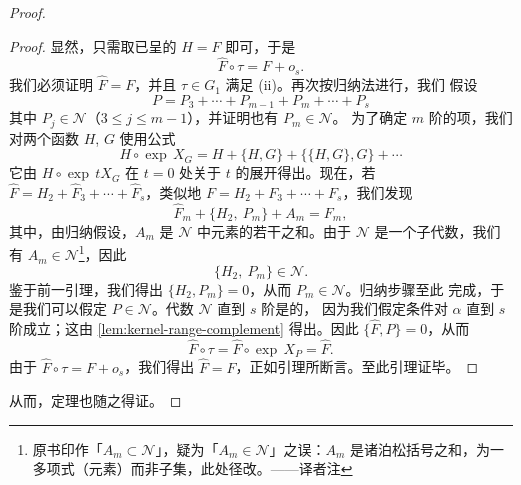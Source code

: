 \begin{proof}
\begin{proof}
\let\qed\relax%
显然，只需取已呈\trNormalForm{}的 $H=F$ 即可，于是
\[
\hat{F}\circ\tau=F+o_s.
\]
我们必须证明 $\hat{F}=F$，并且 $\tau\in G_1$ 满足 (ii)。再次按归纳法进行，我们%
假设
\[
P=P_3+\dotsb+P_{m-1}+P_m+\dotsb+P_s
\]
其中 $P_j\in\mathcal{N}$（$3\leq j\leq m-1$），并证明也有 $P_m\in\mathcal{N}$。%
为了确定 $m$ 阶的项，我们对两个函数 $H$, $G$ 使用公式
\[
H\circ\exp\,X_G=H+\{H,G\}+\bigl\{\{H,G\},G\bigr\}+\dotsb
\]
它由 $H\circ\exp\,tX_G$ 在 $t=0$ 处关于 $t$ 的\trTaylor{}展开得出。现在，若%
$\hat{F}=H_2+\hat{F}_3+\dotsb+\hat{F}_s$，类似地 $F=H_2+F_3+\dotsb+F_s$，我们发现
\[
\hat{F}_m+\bigl\{H_2,\ P_m\bigr\}+A_m=F_m,
\]
其中，由归纳假设，$A_m$ 是 $\mathcal{N}$ 中元素的若干\trPoissonBracket{}之和。由于%
$\mathcal{N}$ 是一个子代数，我们有 $A_m\in\mathcal{N}$\footnote{原书印作「$A_m\subset\mathcal{N}$」，疑为「$A_m\in\mathcal{N}$」之误：$A_m$ 是诸泊松括号之和，为一多项式（元素）而非子集，此处径改。——译者注}，因此
\[
\bigl\{H_2,\ P_m\bigr\}\in\mathcal{N}.
\]
鉴于前一引理，我们得出 $\{H_2,P_m\}=0$，从而 $P_m\in\mathcal{N}$。归纳步骤至此%
完成，于是我们可以假定 $P\in\mathcal{N}$。代数 $\mathcal{N}$ 直到 $s$ 阶是\trAbelian{}的，%
因为我们假定\trNonresonance{}条件对 $\alpha$ 直到 $s$ 阶成立；这由%
\cref{lem:kernel-range-complement} 得出。因此 $\{\hat{F},P\}=0$，从而
\[
\hat{F}\circ\tau=\hat{F}\circ\exp\,X_P=\hat{F}.
\]
由于 $\hat{F}\circ\tau=F+o_s$，我们得出 $\hat{F}=F$，正如引理所断言。至此引理证毕。
\end{proof}

从而，\trBirkhoff{}定理也随之得证。
\end{proof}

